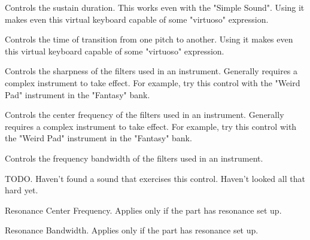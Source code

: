    Controls the sustain duration.  This works even with the "Simple Sound".
   Using it makes even this virtual keyboard capable of some "virtuoso"
   expression.

   Controls the time of transition from one pitch to another.
   Using it makes even this virtual keyboard capable of some "virtuoso"
   expression.

   Controls the sharpness of the filters used in an instrument.
   Generally requires a complex instrument to take effect.
   For example, try this control with the "Weird Pad" instrument in the
   "Fantasy" bank.

   Controls the center frequency of the filters used in an instrument.
   Generally requires a complex instrument to take effect.
   For example, try this control with the "Weird Pad" instrument in the
   "Fantasy" bank.

   Controls the frequency bandwidth of the filters used in an instrument.

   TODO.
   Haven't found a sound that exercises this control.
   Haven't looked all that hard yet.

   Resonance Center Frequency.
   Applies only if the part has resonance set up.

   Resonance Bandwidth.
   Applies only if the part has resonance set up.

